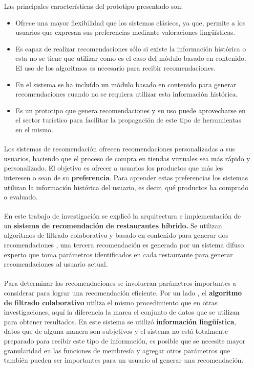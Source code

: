\documentclass[12pt,letterpaper,oneside] {memoir}
\begin{document}
Las principales características del prototipo presentado son:
\begin{itemize}
\item Ofrece una mayor flexibilidad que los sistemas clásicos, ya que, permite a los usuarios que expresan sus preferencias mediante valoraciones lingüísticas.
\item Es capaz de realizar recomendaciones sólo si existe la información histórica o esta no se tiene que utilizar como es el caso del módulo basado en contenido. El uso de los algoritmos es necesario para recibir recomendaciones.
\item En el sistema se ha incluído un módulo basado en contenido para generar recomendaciones cuando no se requiera utilizar esta información histórica.
\item Es un prototipo que genera recomendaciones y su uso puede aprovecharse en  el sector turístico para facilitar la propagación de este tipo de herramientas en el mismo. 
\end{itemize}

\paragraph{}
Los sistemas de recomendación ofrecen recomendaciones personalizadas a sus usuarios, haciendo que el proceso de compra en tiendas virtuales  sea más rápido y personalizado. El objetivo es ofrecer a usuarios los productos que más les interesen o sean de su  \textbf{preferencia}. Para aprender estas preferencias los sistemas utilizan la información histórica del usuario, es decir, qué productos ha comprado o  evaluado. 
\paragraph{}
En este trabajo de investigación se explicó la arquitectura e implementación de un \textbf{sistema de recomendación de restaurantes híbrido.} Se utilizan algoritmos de filtrado colaborativo \citep{Segaran2007} y  basado en contenido para generar dos recomendaciones \citep{Burke2002}, una tercera recomendación es generada por un sistema difuso experto que toma parámetros identificados en cada restaurante para generar recomendaciones al usuario actual.
\paragraph{}
Para determinar las recomendaciones se involucran parámetros importantes a considerar para lograr una recomendación eficiente. Por un lado , el \textbf{ algoritmo de filtrado colaborativo} utiliza el mismo procedimiento que en otras investigaciones, aquí la diferencia la marca el conjunto de datos que se utilizan para obtener resultados. En este sistema se utilizó \textbf{información lingüística}, datos que de alguna manera son subjetivos y el sistema no está totalmente preparado para recibir este tipo de información, es posible que se necesite mayor granularidad en las funciones de membresía y agregar otros parámetros que también pueden ser importantes para un usuario al generar una recomendación.  
\end{document}
